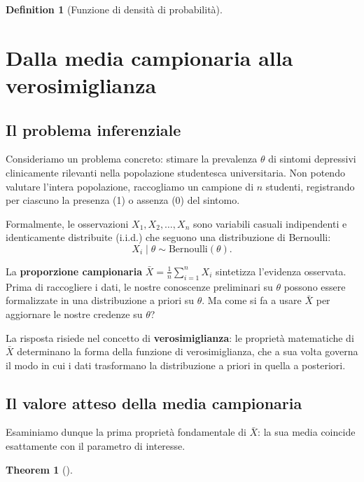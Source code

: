\documentclass[
  letterpaper,
  DIV=11,
  numbers=noendperiod,
  oneside]{scrreprt}
\theoremstyle{definition}
\theoremstyle{plain}
\newtheorem{theorem}{Theorem}[chapter]
\theoremstyle{definition}
\newtheorem{definition}{Definition}[chapter]
\theoremstyle{remark}
\begin{document}
\begin{definition}[Funzione di densità di
probabilità]
\begin{tcolorbox}
\end{tcolorbox}

\section{Dalla media campionaria alla
verosimiglianza}\label{dalla-media-campionaria-alla-verosimiglianza}

\subsection{Il problema inferenziale}\label{il-problema-inferenziale}

Consideriamo un problema concreto: stimare la prevalenza \(\theta\) di
sintomi depressivi clinicamente rilevanti nella popolazione studentesca
universitaria. Non potendo valutare l'intera popolazione, raccogliamo un
campione di \(n\) studenti, registrando per ciascuno la presenza (1) o
assenza (0) del sintomo.

Formalmente, le osservazioni \(X_1, X_2, \ldots, X_n\) sono variabili
casuali indipendenti e identicamente distribuite (i.i.d.) che seguono
una distribuzione di Bernoulli: \[
X_i \mid \theta \sim \text{Bernoulli}(\theta).
\]

La \textbf{proporzione campionaria}
\(\bar{X} = \frac{1}{n}\sum_{i=1}^n X_i\) sintetizza l'evidenza
osservata. Prima di raccogliere i dati, le nostre conoscenze preliminari
su \(\theta\) possono essere formalizzate in una distribuzione a priori
su \(\theta\). Ma come si fa a usare \(\bar{X}\) per aggiornare le
nostre credenze su \(\theta\)?

La risposta risiede nel concetto di \textbf{verosimiglianza}: le
proprietà matematiche di \(\bar{X}\) determinano la forma della funzione
di verosimiglianza, che a sua volta governa il modo in cui i dati
trasformano la distribuzione a priori in quella a posteriori.

\subsection{Il valore atteso della media
campionaria}\label{il-valore-atteso-della-media-campionaria}

Esaminiamo dunque la prima proprietà fondamentale di \(\bar{X}\): la sua
media coincide esattamente con il parametro di interesse.

\begin{theorem}[]\protect\hypertarget{thm-expval-mean}{}\label{thm-expval-mean}


\end{theorem}
\end{definition}
\end{document}
